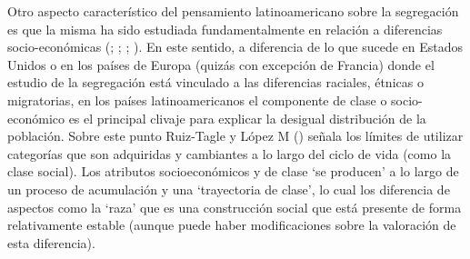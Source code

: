 \documentclass[
  spanish,
  a4paper,%
  chapterprefix=true,%
  DIV=calc,%
  twoside]{scrbook}%
\begin{document}
Otro aspecto característico del
pensamiento latinoamericano sobre la segregación es que la misma ha sido
estudiada fundamentalmente en relación a diferencias socio-económicas
(; ; ; ). En este
sentido, a diferencia de lo que sucede en Estados Unidos o en los países
de Europa (quizás con excepción de Francia) donde el estudio de la
segregación está vinculado a las diferencias raciales, étnicas o
migratorias, en los países latinoamericanos el componente de clase o
socio-económico es el principal clivaje para explicar la desigual
distribución de la población. Sobre este punto Ruiz-Tagle y López M () señala
los límites de utilizar categorías que son adquiridas y cambiantes a lo
largo del ciclo de vida (como la clase social). Los atributos
socioeconómicos y de clase `se producen' a lo largo de un proceso de
acumulación y una `trayectoria de clase', lo cual los diferencia de
aspectos como la `raza' que es una construcción social que está presente
de forma relativamente estable (aunque puede haber modificaciones sobre
la valoración de esta diferencia).
\end{document}
